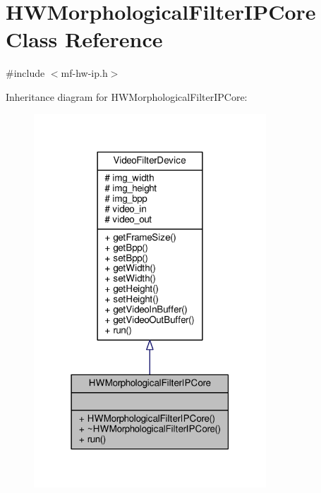 \hypertarget{classHWMorphologicalFilterIPCore}{}\section{H\+W\+Morphological\+Filter\+I\+P\+Core Class Reference}
\label{classHWMorphologicalFilterIPCore}


{\ttfamily \#include $<$mf-\/hw-\/ip.\+h$>$}



Inheritance diagram for H\+W\+Morphological\+Filter\+I\+P\+Core\+:
\nopagebreak
\begin{figure}[H]
\begin{center}
\leavevmode
\includegraphics[width=247pt]{classHWMorphologicalFilterIPCore__inherit__graph}
\end{center}
\end{figure}



